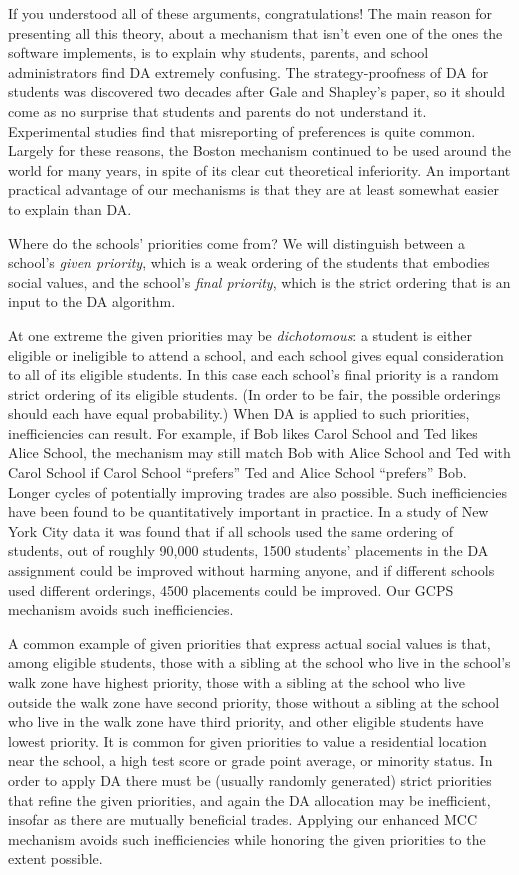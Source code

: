 \documentclass[12pt]{article}
\theoremstyle{definition}
\begin{document}
If you understood all of these arguments, congratulations!  The main
reason for presenting all this theory, about a mechanism that isn't
even one of the ones the software implements, is to explain why
students, parents, and school administrators find DA extremely
confusing.  The strategy-proofness of DA for students was discovered
two decades after Gale and Shapley's paper, so it should come as no
surprise that students and parents do not understand it.  Experimental
studies find that misreporting of preferences is quite common.
Largely for these reasons, the Boston mechanism continued to be used
around the world for many years, in spite of its clear cut theoretical
inferiority.  An important practical advantage of our mechanisms is
that they are at least somewhat easier to explain than DA.

Where do the schools' priorities come from?  We will distinguish
between a school's \emph{given priority}, which is a weak ordering of
the students that embodies social values, and the school's \emph{final
priority}, which is the strict ordering that is an input to the DA
algorithm.

At one extreme the given priorities may be \emph{dichotomous}: a
student is either eligible or ineligible to attend a school, and each
school gives equal consideration to all of its eligible students.  In
this case each school's final priority is a random strict ordering of
its eligible students.  (In order to be fair, the possible orderings
should each have equal probability.)  When DA is applied to such
priorities, inefficiencies can result.  For example, if Bob likes
Carol School and Ted likes Alice School, the mechanism may still match
Bob with Alice School and Ted with Carol School if Carol School
``prefers'' Ted and Alice School ``prefers'' Bob.  Longer cycles of
potentially improving trades are also possible.  Such inefficiencies
have been found to be quantitatively important in practice.  In a
study of New York City data \citep{apr09aer} it was found that if all
schools used the same ordering of students, out of roughly 90,000
students, 1500 students' placements in the DA assignment could be
improved without harming anyone, and if different schools used
different orderings, 4500 placements could be improved.  Our GCPS
mechanism avoids such inefficiencies.

A common example of given priorities that express actual social values
is that, among eligible students, those with a sibling at the school
who live in the school's walk zone have highest priority, those with a
sibling at the school who live outside the walk zone have second
priority, those without a sibling at the school who live in the walk
zone have third priority, and other eligible students have lowest
priority.  It is common for given priorities to value a residential
location near the school, a high test score or grade point average, or
minority status.  In order to apply DA there must be (usually randomly
generated) strict priorities that refine the given priorities, and
again the DA allocation may be inefficient, insofar as there are
mutually beneficial trades.  Applying our enhanced MCC mechanism
avoids such inefficiencies while honoring the given priorities to the
extent possible.
\end{document}

